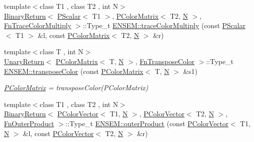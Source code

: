 \begin{DoxyCompactItemize}
\item 
{\footnotesize template$<$class T1 , class T2 , int N$>$ }\\\mbox{\hyperlink{structENSEM_1_1BinaryReturn}{Binary\+Return}}$<$ \mbox{\hyperlink{classENSEM_1_1PScalar}{P\+Scalar}}$<$ T1 $>$, \mbox{\hyperlink{classENSEM_1_1PColorMatrix}{P\+Color\+Matrix}}$<$ T2, \mbox{\hyperlink{operator__name__util_8cc_a7722c8ecbb62d99aee7ce68b1752f337}{N}} $>$, \mbox{\hyperlink{structENSEM_1_1FnTraceColorMultiply}{Fn\+Trace\+Color\+Multiply}} $>$\+::Type\+\_\+t \mbox{\hyperlink{group__primcolormatrix_ga0e0db533c0e6dc778fc9f271537b96eb}{E\+N\+S\+E\+M\+::trace\+Color\+Multiply}} (const \mbox{\hyperlink{classENSEM_1_1PScalar}{P\+Scalar}}$<$ T1 $>$ \&l, const \mbox{\hyperlink{classENSEM_1_1PColorMatrix}{P\+Color\+Matrix}}$<$ T2, \mbox{\hyperlink{operator__name__util_8cc_a7722c8ecbb62d99aee7ce68b1752f337}{N}} $>$ \&r)
\item 
{\footnotesize template$<$class T , int N$>$ }\\\mbox{\hyperlink{structENSEM_1_1UnaryReturn}{Unary\+Return}}$<$ \mbox{\hyperlink{classENSEM_1_1PColorMatrix}{P\+Color\+Matrix}}$<$ T, \mbox{\hyperlink{operator__name__util_8cc_a7722c8ecbb62d99aee7ce68b1752f337}{N}} $>$, \mbox{\hyperlink{structENSEM_1_1FnTransposeColor}{Fn\+Transpose\+Color}} $>$\+::Type\+\_\+t \mbox{\hyperlink{group__primcolormatrix_gad27a30bd1b98827095b42464443c9ffc}{E\+N\+S\+E\+M\+::transpose\+Color}} (const \mbox{\hyperlink{classENSEM_1_1PColorMatrix}{P\+Color\+Matrix}}$<$ T, \mbox{\hyperlink{operator__name__util_8cc_a7722c8ecbb62d99aee7ce68b1752f337}{N}} $>$ \&s1)
\begin{DoxyCompactList}\small\item\em \mbox{\hyperlink{classENSEM_1_1PColorMatrix}{P\+Color\+Matrix}} = transpose\+Color(\+P\+Color\+Matrix) \end{DoxyCompactList}\item 
{\footnotesize template$<$class T1 , class T2 , int N$>$ }\\\mbox{\hyperlink{structENSEM_1_1BinaryReturn}{Binary\+Return}}$<$ \mbox{\hyperlink{classENSEM_1_1PColorVector}{P\+Color\+Vector}}$<$ T1, \mbox{\hyperlink{operator__name__util_8cc_a7722c8ecbb62d99aee7ce68b1752f337}{N}} $>$, \mbox{\hyperlink{classENSEM_1_1PColorVector}{P\+Color\+Vector}}$<$ T2, \mbox{\hyperlink{operator__name__util_8cc_a7722c8ecbb62d99aee7ce68b1752f337}{N}} $>$, \mbox{\hyperlink{structENSEM_1_1FnOuterProduct}{Fn\+Outer\+Product}} $>$\+::Type\+\_\+t \mbox{\hyperlink{group__primcolormatrix_ga4f0b21163125568ab5bcbbef75a17973}{E\+N\+S\+E\+M\+::outer\+Product}} (const \mbox{\hyperlink{classENSEM_1_1PColorVector}{P\+Color\+Vector}}$<$ T1, \mbox{\hyperlink{operator__name__util_8cc_a7722c8ecbb62d99aee7ce68b1752f337}{N}} $>$ \&l, const \mbox{\hyperlink{classENSEM_1_1PColorVector}{P\+Color\+Vector}}$<$ T2, \mbox{\hyperlink{operator__name__util_8cc_a7722c8ecbb62d99aee7ce68b1752f337}{N}} $>$ \&r)

\end{DoxyCompactItemize}
